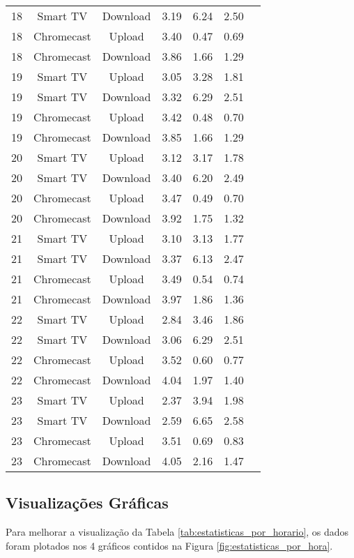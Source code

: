 \begin{longtable}{|c|c|c|c|c|c|c|}
    18 & Smart TV & Download & 3.19 & 6.24 & 2.50 \\
    18 & Chromecast & Upload & 3.40 & 0.47 & 0.69 \\
    18 & Chromecast & Download & 3.86 & 1.66 & 1.29 \\
    \hline
    19 & Smart TV & Upload & 3.05 & 3.28 & 1.81 \\
    19 & Smart TV & Download & 3.32 & 6.29 & 2.51 \\
    19 & Chromecast & Upload & 3.42 & 0.48 & 0.70 \\
    19 & Chromecast & Download & 3.85 & 1.66 & 1.29 \\
    \hline
    20 & Smart TV & Upload & 3.12 & 3.17 & 1.78 \\
    20 & Smart TV & Download & 3.40 & 6.20 & 2.49 \\
    20 & Chromecast & Upload & 3.47 & 0.49 & 0.70 \\
    20 & Chromecast & Download & 3.92 & 1.75 & 1.32 \\
    \hline
    21 & Smart TV & Upload & 3.10 & 3.13 & 1.77 \\
    21 & Smart TV & Download & 3.37 & 6.13 & 2.47 \\
    21 & Chromecast & Upload & 3.49 & 0.54 & 0.74 \\
    21 & Chromecast & Download & 3.97 & 1.86 & 1.36 \\
    \hline
    22 & Smart TV & Upload & 2.84 & 3.46 & 1.86 \\
    22 & Smart TV & Download & 3.06 & 6.29 & 2.51 \\
    22 & Chromecast & Upload & 3.52 & 0.60 & 0.77 \\
    22 & Chromecast & Download & 4.04 & 1.97 & 1.40 \\
    \hline
    23 & Smart TV & Upload & 2.37 & 3.94 & 1.98 \\
    23 & Smart TV & Download & 2.59 & 6.65 & 2.58 \\
    23 & Chromecast & Upload & 3.51 & 0.69 & 0.83 \\
    23 & Chromecast & Download & 4.05 & 2.16 & 1.47 \\
    \hline
        
\end{longtable}

\subsection{Visualizações Gráficas}

Para melhorar a visualização da Tabela \ref{tab:estatisticas_por_horario}, os dados foram plotados nos 4 gráficos contidos na Figura \ref{fig:estatisticas_por_hora}.


